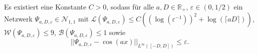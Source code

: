 \documentclass[11pt]{scrartcl}
\newcommand{\R}{\mathbb{R}} %
\begin{document}
\begin{theorem} %
    \newcommand{\Psia}{\Psi_{a,D,\varepsilon}}
    Es existiert eine Konstante \(C>0\), sodass für alle \(a,D\in \R_+\), \(\varepsilon \in (0,1/2)\) 
    ein Netzwerk \(\Psia \in \mathcal{N}_{1,1}\) mit \(\mathcal{L}(\Psia) \leq C((\log(\varepsilon^{-1}))^2 + \log(\lceil aD\rceil))\), 
    \(\mathcal{W}(\Psia) \leq 9\), \(\mathcal{B}(\Psia) \leq 1\) sowie 
    \[ ||\Psia - \cos(a x) ||_{L^{\infty}([-D,D])} \leq \varepsilon. \]
\end{theorem}

\nocite{Grohs2019}
\printbibliography{}
\end{document}
